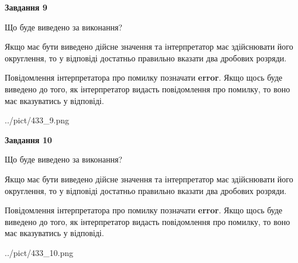\documentclass[12pt, ukrainian]{article}
\begin{document}
{\begin {Large}
{\begin {center}\textbf{Завдання 9}\end {center}}\par
Що буде виведено за виконання? \par

Якщо має бути виведено дійсне значення та інтерпретатор має здійснювати його округлення, 
то у відповіді достатньо правильно вказати два дробових розряди.

Повідомлення інтерпретатора про помилку позначати \textbf{error}.
Якщо щось буде виведено до того, як інтерпретатор видасть повідомлення про помилку, 
то воно має вказуватись у відповіді. \par

\begin{center}
	{../pict/433_9.png}
\end{center}
\newpage

{\begin {center}\textbf{Завдання 10}\end {center}}\par
Що буде виведено за виконання? \par

Якщо має бути виведено дійсне значення та інтерпретатор має здійснювати його округлення, 
то у відповіді достатньо правильно вказати два дробових розряди.

Повідомлення інтерпретатора про помилку позначати \textbf{error}.
Якщо щось буде виведено до того, як інтерпретатор видасть повідомлення про помилку, 
то воно має вказуватись у відповіді. \par

\begin{center}
	{../pict/433_10.png}
\end{center}
\newpage

\end {Large}}
\end{document}
